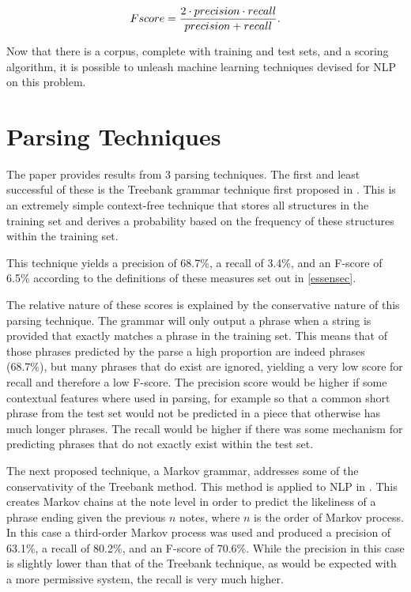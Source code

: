 \documentclass[a4paper,12pt]{article}
\begin{document}
$$ F\-score = \frac{2 \cdot precision \cdot recall}{precision+recall}. $$

Now that there is a corpus, complete with training and test sets, and a scoring algorithm, it is possible to unleash machine learning techniques devised for NLP on this problem.

\section{Parsing Techniques}

The paper provides results from 3 parsing techniques. The first and least successful of these is the Treebank grammar technique first proposed in \cite{Bod93}. This is an extremely simple context-free technique that stores all structures in the training set and derives a probability based on the frequency of these structures within the training set.

This technique yields a precision of 68.7\%, a recall of 3.4\%, and an F-score of 6.5\% according to the definitions of these measures set out in \ref{essensec}.

The relative nature of these scores is explained by the conservative nature of this parsing technique. The grammar will only output a phrase when a string is provided that exactly matches a phrase in the training set. This means that of those phrases predicted by the parse a high proportion are indeed phrases (68.7\%), but many phrases that do exist are ignored, yielding a very low score for recall and therefore a low F-score. The precision score would be higher if some contextual features where used in parsing, for example so that a common short phrase from the test set would not be predicted in a piece that otherwise has much longer phrases. The recall would be higher if there was some mechanism for predicting phrases that do not exactly exist within the test set.

The next proposed technique, a Markov grammar, addresses some of the conservativity of the Treebank method. This method is applied to NLP in \cite{Seneff1992}. This creates Markov chains at the note level in order to predict the likeliness of a phrase ending given the previous $n$ notes, where $n$ is the order of Markov process. In this case a third-order Markov process was used and produced a  precision of 63.1\%, a recall of 80.2\%, and an F-score of 70.6\%. While the precision in this case is slightly lower than that of the Treebank technique, as would be expected with a more permissive system, the recall is very much higher.
\end{document}
